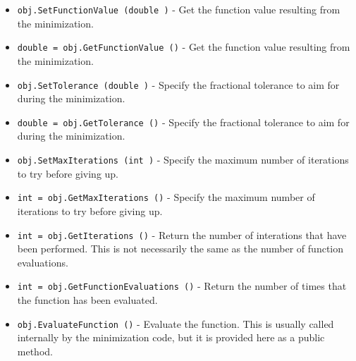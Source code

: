 \begin{itemize}
\item  \verb|obj.SetFunctionValue (double )| -  Get the function value resulting from the minimization.

\item  \verb|double = obj.GetFunctionValue ()| -  Get the function value resulting from the minimization.

\item  \verb|obj.SetTolerance (double )| -  Specify the fractional tolerance to aim for during the minimization.

\item  \verb|double = obj.GetTolerance ()| -  Specify the fractional tolerance to aim for during the minimization.

\item  \verb|obj.SetMaxIterations (int )| -  Specify the maximum number of iterations to try before giving up.

\item  \verb|int = obj.GetMaxIterations ()| -  Specify the maximum number of iterations to try before giving up.

\item  \verb|int = obj.GetIterations ()| -  Return the number of interations that have been performed.  This
 is not necessarily the same as the number of function evaluations.

\item  \verb|int = obj.GetFunctionEvaluations ()| -  Return the number of times that the function has been evaluated.

\item  \verb|obj.EvaluateFunction ()| -  Evaluate the function.  This is usually called internally by the
 minimization code, but it is provided here as a public method.

\end{itemize}
